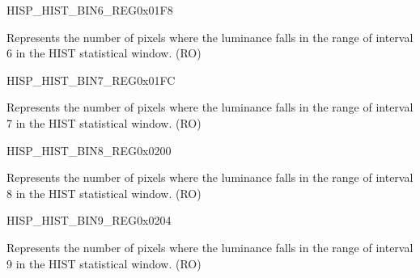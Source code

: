 \begin{register}{H}{ISP\_HIST\_BIN6\_REG}{0x01F8}\label{regdesc:ISPHISTBIN6REG}
%
%
\regnewline%
\begin{regdesc}\begin{reglist}
\label{fielddesc:ISPHISTBIN6}\item [ISP\_HIST\_BIN\_6] Represents the number of pixels where the luminance falls in the range of interval 6 in the HIST statistical window. (RO)
\end{reglist}\end{regdesc}
\end{register}


\begin{register}{H}{ISP\_HIST\_BIN7\_REG}{0x01FC}\label{regdesc:ISPHISTBIN7REG}
%
%
\regnewline%
\begin{regdesc}\begin{reglist}
\label{fielddesc:ISPHISTBIN7}\item [ISP\_HIST\_BIN\_7] Represents the number of pixels where the luminance falls in the range of interval 7 in the HIST statistical window. (RO)
\end{reglist}\end{regdesc}
\end{register}


\begin{register}{H}{ISP\_HIST\_BIN8\_REG}{0x0200}\label{regdesc:ISPHISTBIN8REG}
%
%
\regnewline%
\begin{regdesc}\begin{reglist}
\label{fielddesc:ISPHISTBIN8}\item [ISP\_HIST\_BIN\_8] Represents the number of pixels where the luminance falls in the range of interval 8 in the HIST statistical window. (RO)
\end{reglist}\end{regdesc}
\end{register}


\begin{register}{H}{ISP\_HIST\_BIN9\_REG}{0x0204}\label{regdesc:ISPHISTBIN9REG}
%
%
\regnewline%
\begin{regdesc}\begin{reglist}
\label{fielddesc:ISPHISTBIN9}\item [ISP\_HIST\_BIN\_9] Represents the number of pixels where the luminance falls in the range of interval 9 in the HIST statistical window. (RO)
\end{reglist}\end{regdesc}
\end{register}


